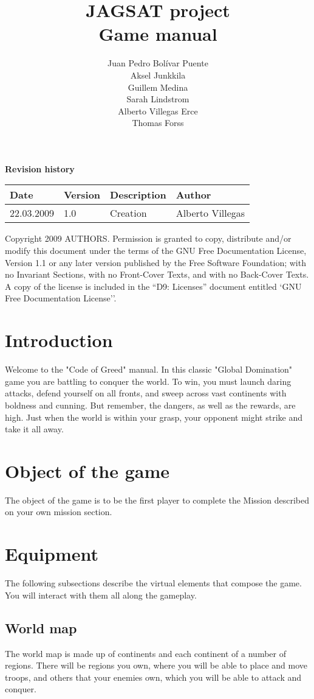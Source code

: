 \documentclass[12pt,a4paper]{article}
\title{\large JAGSAT project\\\huge Game manual}
\author{
  Juan Pedro Bolívar Puente\\ 
  Aksel Junkkila\\
  Guillem Medina\\ 
  Sarah Lindstrom\\ 
  Alberto Villegas Erce\\ 
  Thomas Forss
}
\begin{document}
\maketitle

\begin{center}
\textbf{Revision history}

\begin{tabular}{ l | l | l | l }
Date			&Version	&Description		&Author\\\hline\hline
22.03.2009	&1.0		&Creation			&Alberto Villegas 
\end{tabular}
\label{tab:rev}
\end{center}

\vfill
Copyright 2009 AUTHORS.
Permission is granted to copy, distribute and/or modify this document under the terms of the GNU Free Documentation License, Version 1.1 or any later version published by the Free Software Foundation;  with no Invariant Sections, with no Front-Cover Texts, and with no Back-Cover Texts. A copy of the license is included in the ``D9: Licenses''  document entitled `GNU Free Documentation License''.

\pagebreak
\tableofcontents
\pagebreak

\section{Introduction}
Welcome to the "Code of Greed" manual. In this classic "Global Domination" game  you are battling to conquer the world. To win, you must launch daring attacks, defend yourself on all fronts, and sweep across vast continents with boldness and cunning. But remember, the dangers, as well as the rewards, are high. Just when the world is within your grasp, your opponent might strike and take it all away.

\section{Object of the game}
The object of the game is to be the first player to complete the Mission described on your own mission section.

\section{Equipment}
The following subsections describe the virtual elements that compose the game. You will interact with them all along the gameplay.

\subsection{World map}
The world map is made up of continents and each continent of a number of regions. There will be regions you own, where you will be able to place and move troops, and others that your enemies own, which you will be able to attack and conquer.
\end{document}
